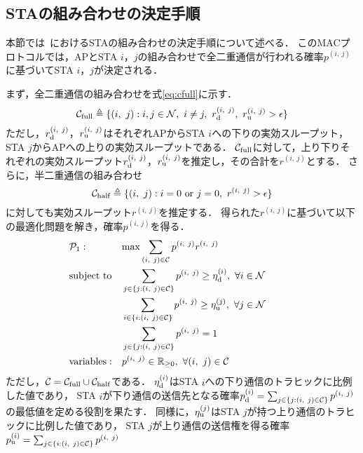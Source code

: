 \documentclass[technicalreport]{ieicej}
\newcommand{\sij}{(i,\ j)}
\newcommand{\pij}{p^{(i,\ j)}}
\newcommand{\rd}{r^{\sij}_{\rm d}}
\newcommand{\ru}{r^{\sij}_{\rm u}}
\newcommand{\rij}{r^{\sij}}
\begin{document}
	\subsection{STAの組み合わせの決定手順}\label{sec:promac}
		本節では~\cite{promac}におけるSTAの組み合わせの決定手順について述べる．
		このMACプロトコルでは，APとSTA $i$，$j$の組み合わせで全二重通信が行われる確率$\pij$に基づいてSTA $i$，$j$が決定される．
		\par
		まず，全二重通信の組み合わせを式\eqref{eq:cfull}に示す．
		\begin{equation}
			{\mathcal C}_{\rm full} \triangleq \{\sij : i,j\in{\mathcal N},\ i\neq j,\ r^{\sij}_{\rm d},\ r^{\sij}_{\rm u}>\epsilon\} \label{eq:cfull}
		\end{equation}
		ただし，$r_{\rm d}^{\sij}$，$r_{\rm u}^{\sij}$はそれぞれAPからSTA $i$への下りの実効スループット，
		STA $j$からAPへの上りの実効スループットである．
		${\mathcal C}_{\rm full}$に対して，上り下りそれぞれの実効スループット$\rd$，$\ru$を推定し，その合計を$\rij$とする．
		さらに，半二重通信の組み合わせ
		\begin{equation}
			{\mathcal C}_{\rm half} \triangleq \{\sij : i=0\ {\rm or}\ j=0,\ \rij >\epsilon\}
		\end{equation}
		に対しても実効スループット$\rij$を推定する．
		得られた$\rij$に基づいて以下の最適化問題を解き，確率$\pij$を得る．
		\begin{align}
			&{\mathcal P}_1: && {\rm max} \sum_{(i,\ j)\in{\mathcal C}} p^{(i,\ j)}r^{(i,\ j)} &&&&&& \label{eq:p1}\\
			&{\rm subject\ to} && \sum_{j\in\{j:(i,\ j)\in{\mathcal C}\}} p^{(i,\ j)} \geq \eta_{\rm d}^{(i)},\ \forall i\in {\mathcal N}  \\
			&&& \sum_{i\in\{i:(i,\ j)\in{\mathcal C}\}} p^{(i,\ j)} \geq \eta_{\rm u}^{(j)},\ \forall j\in {\mathcal N} \label{eq:pu}\\
			&&& \sum_{j\in\{j:(i,\ j)\in{\mathcal C}\}} p^{(i,\ j)}=1 \\
			&{\rm variables:} &&p^{(i,\ j)} \in {\mathbb R}_{\geq 0},\ \forall(i,\ j)\in {\mathcal C} \nonumber
		\end{align}
		ただし，${\mathcal C} = {\mathcal C}_{\rm full} \cup {\mathcal C}_{\rm half}$である．
		$\eta_{\rm d}^{(i)}$はSTA $i$への下り通信のトラヒックに比例した値であり，
		STA $i$が下り通信の送信先となる確率$p_{\rm d}^{(i)}=\sum_{j\in\{j:(i,\ j)\in{\mathcal C}\}} p^{(i,\ j)}$
		の最低値を定める役割を果たす．
		同様に，$\eta_{\rm u}^{(j)}$はSTA $j$が持つ上り通信のトラヒックに比例した値であり，
		STA $j$が上り通信の送信権を得る確率$p_{\rm u}^{(i)}=\sum_{j\in\{i:(i,\ j)\in{\mathcal C}\}} p^{(i,\ j)}$
\end{document}
